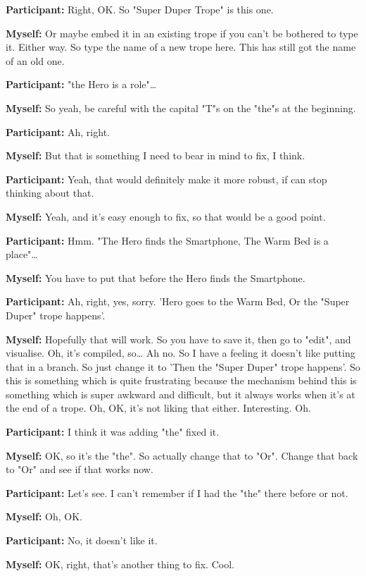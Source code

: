 \documentclass[11pt]{report}
\begin{document}
\begin{linenumbers}
\textbf{Participant:} Right, OK. So "Super Duper Trope" is this one.

\textbf{Myself:} Or maybe embed it in an existing trope if you can't be bothered to type it. Either way. So type the name of a new trope here. This has still got the name of an old one.

\textbf{Participant:} "the Hero is a role"\ldots{}

\textbf{Myself:} So yeah, be careful with the capital "T"s on the "the"s at the beginning.

\textbf{Participant:} Ah, right.

\textbf{Myself:} But that is something I need to bear in mind to fix, I think.

\textbf{Participant:} Yeah, that would definitely make it more robust, if can stop thinking about that.

\textbf{Myself:} Yeah, and it's easy enough to fix, so that would be a good point.

\textbf{Participant:} Hmm. "The Hero finds the Smartphone, The Warm Bed is a place"\ldots{}

\textbf{Myself:} You have to put that before the Hero finds the
Smartphone.

\textbf{Participant:} Ah, right, yes, sorry. 'Hero goes to the Warm Bed, Or the "Super Duper" trope happens'.

\textbf{Myself:} Hopefully that will work. So you have to save it, then go to "edit", and visualise. Oh, it's compiled, so\ldots{} Ah no. So I have a feeling it doesn't like putting that in a branch. So just change it to 'Then the "Super Duper" trope happens'. So this is something which is quite frustrating because the mechanism behind this is something which is super awkward and difficult, but it always works when it's at the end of a trope. Oh, OK, it's not liking that either. Interesting. Oh.

\textbf{Participant:} I think it was adding "the" fixed it.

\textbf{Myself:} OK, so it's the "the". So actually change that to "Or". Change that back to "Or" and see if that works now.

\textbf{Participant:} Let's see. I can't remember if I had the "the" there before or not.

\textbf{Myself:} Oh, OK.

\textbf{Participant:} No, it doesn't like it.

\textbf{Myself:} OK, right, that's another thing to fix. Cool.


\end{linenumbers}
\end{document}
